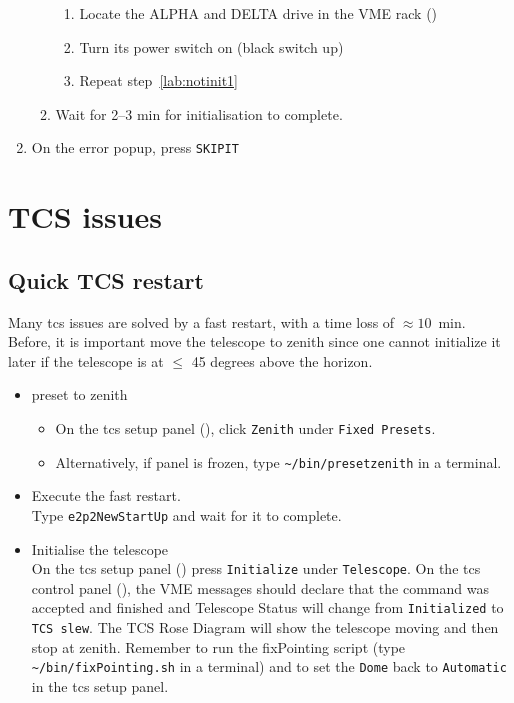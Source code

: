 \documentclass[11pt,fleqn,a4paper]{book}
\def\home{\textasciitilde{}}
\begin{document}
\begin{enumerate}
\begin{enumerate}
\begin{enumerate}
                    \item Locate the ALPHA and DELTA drive in the VME rack ()
                    \item Turn its power switch on (black switch up)
                    \item Repeat step~\ref{lab:notinit1}
                \end{enumerate}
            \item Wait for 2--3 min for initialisation to complete.
        \end{enumerate}
    \item On the error popup, press \texttt{SKIPIT}
\end{enumerate}

\section{TCS issues}
\subsection{Quick TCS restart}
\label{sec:tcsrestart}

Many \gls{tcs} issues are solved by a fast restart, with a time loss of $\approx 10$~min. Before, it is important move the telescope to zenith since one cannot initialize it later if the telescope is at $\le$ 45 degrees above the horizon.

\begin{itemize}
 \item \gls{preset} to zenith
    \begin{itemize}
	\item On the \gls{tcs} setup panel (), click \texttt{Zenith} under \texttt{Fixed Presets}.
        \item Alternatively, if panel is frozen, type \texttt{\home/bin/presetzenith} in a terminal.
    \end{itemize}
 \item Execute the fast restart.\\
       Type \texttt{e2p2NewStartUp} and wait for it to complete.
 \item Initialise the telescope\\
       On the \gls{tcs} setup panel () press \texttt{Initialize} under \texttt{Telescope}. On the \gls{tcs} control panel (), the VME messages should declare that the command was accepted and finished and Telescope Status will change from \texttt{Initialized} to \texttt{TCS slew}. The TCS Rose Diagram will show the telescope moving and then stop at zenith. Remember to run the  fixPointing script (type \texttt{\home/bin/fixPointing.sh} in a terminal) and to set the \texttt{Dome} back to \texttt{Automatic} in the \gls{tcs} setup panel.
\end{itemize}
\end{document}
